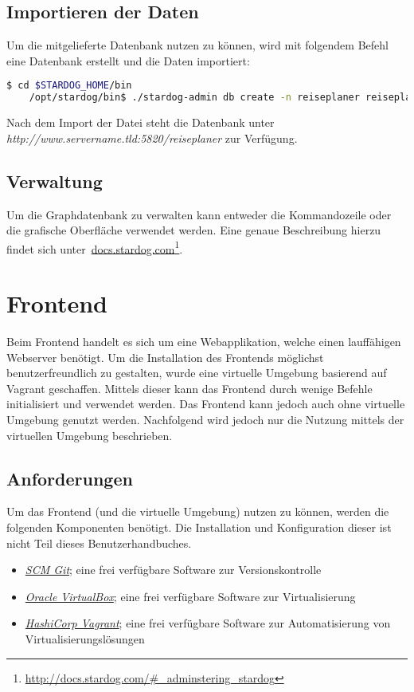 \subsection{Importieren der Daten}
\label{chap:anh:ihb:backend:import}
Um die mitgelieferte Datenbank nutzen zu können, wird mit folgendem Befehl eine Datenbank erstellt und die Daten importiert:
\begin{lstlisting}[language=bash]
                    $ cd $STARDOG_HOME/bin
    /opt/stardog/bin$ ./stardog-admin db create -n reiseplaner reiseplaner.owl
\end{lstlisting}
Nach dem Import der Datei steht die Datenbank unter \textit{http://www.servername.tld:5820/reiseplaner} zur Verfügung.

\subsection{Verwaltung}
\label{chap:anh:ihb:backend:mgmt}
Um die Graphdatenbank zu verwalten kann entweder die Kommandozeile oder die grafische Oberfläche verwendet werden. Eine genaue Beschreibung hierzu findet sich unter~\href{http://docs.stardog.com/\#_adminstering_stardog}{docs.stardog.com}\footnote{\url{http://docs.stardog.com/\#_adminstering_stardog}}.


\section{Frontend}
\label{chap:anh:ihb:frontend}
Beim Frontend handelt es sich um eine Webapplikation, welche einen lauffähigen Webserver benötigt. Um die Installation des Frontends möglichst benutzerfreundlich zu gestalten, wurde eine virtuelle Umgebung basierend auf Vagrant geschaffen. Mittels dieser kann das Frontend durch wenige Befehle initialisiert und verwendet werden. Das Frontend kann jedoch auch ohne virtuelle Umgebung genutzt werden. Nachfolgend wird jedoch nur die Nutzung mittels der virtuellen Umgebung beschrieben.

\subsection{Anforderungen}
\label{chap:anh:ihb:frontend:req}
Um das Frontend (und die virtuelle Umgebung) nutzen zu können, werden die folgenden Komponenten benötigt. Die Installation und Konfiguration dieser ist nicht Teil dieses Benutzerhandbuches.
\begin{itemize}
    \item \textit{\href{http://git-scm.com/}{SCM Git}}; eine frei verfügbare Software zur Versionskontrolle
    \item \textit{\href{https://www.virtualbox.org/wiki/Downloads}{Oracle VirtualBox}}; eine frei verfügbare Software zur Virtualisierung
    \item \textit{\href{https://www.vagrantup.com/downloads.html}{HashiCorp Vagrant}}; eine frei verfügbare Software zur Automatisierung von Virtualisierungslösungen
\end{itemize}

